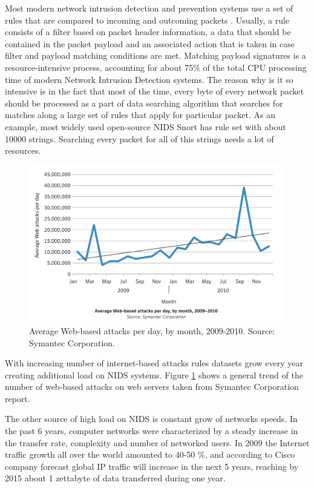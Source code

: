 \documentclass[thesis=M,english]{FITthesis}[2011/07/15]
\begin{document}
Most modern network intrusion detection and prevention systems use a set of rules that are compared to incoming and outcoming packets \cite{symantec_nids_intro}. Usually, a rule consists of a filter based on packet header information, a data that should be contained in the packet payload and an associated action that is taken in case filter and payload matching conditions are met.
Matching payload signatures is a resource-intensive process, accounting for about 75\% of the total CPU processing time of modern Network Intrusion Detection systems. The reason why is it so intensive is in the fact that most of the time, every byte of every network packet should be processed as a part of data searching algorithm that searches for matches along a large set of rules that apply for particular packet. As an example, most widely used open-source NIDS Snort has rule set with about 10000 strings. Searching every packet for all of this strings needs a lot of resources. 
\begin{figure}[h]
\centering
\includegraphics[scale=0.3]{images/web-attacks.png}
\caption{Average Web-based attacks per day, by month, 2009-2010. Source: Symantec Corporation.}
\label{fig:symantec_report}
\end{figure}
With increasing number of internet-based attacks rules datasets grow every year creating additional load on NIDS systems. Figure \ref{fig:symantec_report} shows a general trend of the number of web-based attacks on web servers taken from Symantec Corporation report.

The other source of high load on NIDS is constant grow of networks speeds. In the past 6 years, computer networks were characterized by a steady increase in the transfer rate, complexity and number of networked users. In 2009 the Internet traffic growth all over the world amounted to 40-50 \%, and according to Cisco company forecast \cite{cisco_firecast} global IP traffic will increase in the next 5 years, reaching by 2015 about 1 zettabyte of data transferred during one year.
\end{document}
